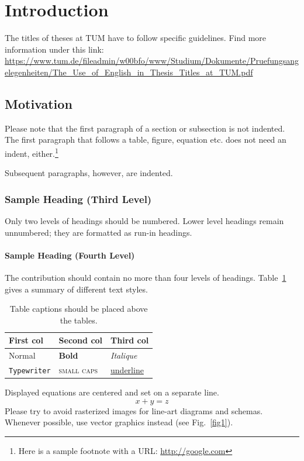 \section{Introduction}
\label{sec:intro}
The titles of theses at TUM have to follow specific guidelines. Find more information under this link:
\url{https://www.tum.de/fileadmin/w00bfo/www/Studium/Dokumente/Pruefungsangelegenheiten/The_Use_of_English_in_Thesis_Titles_at_TUM.pdf}

\subsection{Motivation}
\label{sec:intro:sub:motivation}

Please note that the first paragraph of a section or subsection is not indented.
The first paragraph that follows a table, figure, equation etc. does not need an indent, either.\footnote{Here is a sample footnote with a URL: \url{http://google.com}}

Subsequent paragraphs, however, are indented.

\subsubsection{Sample Heading (Third Level)} Only two levels of
headings should be numbered. Lower level headings remain unnumbered; they are formatted as run-in headings.

\paragraph{Sample Heading (Fourth Level)}
The contribution should contain no more than four levels of headings. 
Table~\ref{tab1} gives a summary of different text styles.

\begin{table}
\caption{Table captions should be placed above the
tables.}\label{tab1}
\centering
\begin{tabular}{|l|l|l|}
\hline
First col &  Second col & Third col\\
\hline
Normal & \textbf{Bold} & \textit{Italique}\\
\texttt{Typewriter} & \textsc{small caps} & \underline{underline}\\
\hline
\end{tabular}
\end{table}


\noindent Displayed equations are centered and set on a separate
line.
\begin{equation}
x + y = z
\end{equation}
Please try to avoid rasterized images for line-art diagrams and schemas. 
Whenever possible, use vector graphics instead (see Fig.~\ref{fig1}).

